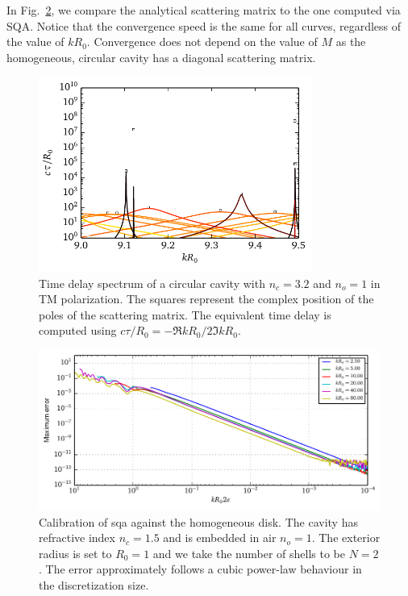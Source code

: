 In Fig.~\ref{fig:passive.numerical.convergenceHomogeneousDisk}, we compare the analytical scattering
matrix to the one computed via SQA. Notice that the convergence speed is the same for all curves, 
regardless of the value of $kR_0$. Convergence does not depend on the value of $M$
as the homogeneous, circular cavity has a diagonal scattering matrix. 

\begin{figure}
  \centering
  \includegraphics[width=0.8\textwidth]{figs/passive/correspondanceRootsPeaks.pdf}
  \caption[Correspondence between the poles of the scattering matrix and the peaks
	  of the time delay spectrum.]
	  {Time delay spectrum of a circular cavity with $n_c=3.2$ and $n_o=1$ in TM polarization. The squares
	  represent the complex position of the poles of the scattering matrix. The equivalent
	  time delay is computed using $c\tau/R_0=-\Re{kR_0}/2\Im{kR_0}$.}
  \label{fig:passive.numerical.correspondanceRoots}
\end{figure}


\begin{figure}
 \centering
 \includegraphics{figs/passive/convergenceHomo.pdf}
 \caption[Convergence properties of SQA when applied on the homogeneous disk]
	  {Calibration of \gls{sqa} against the homogeneous disk. The cavity 
	  has refractive index $n_c=1.5$ and is embedded in air $n_o=1$. The exterior
	  radius is set to $R_0=1$ and we take the number of shells to be $N=2$.
	  The error approximately follows a cubic power-law behaviour in the discretization
	  size.}
 \label{fig:passive.numerical.convergenceHomogeneousDisk}
\end{figure}

